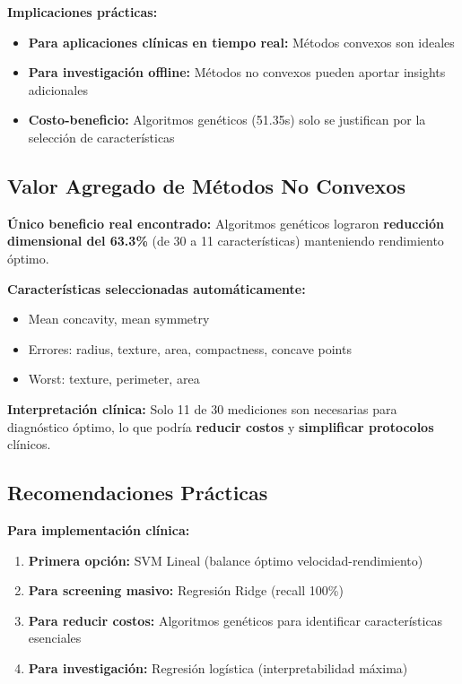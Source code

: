 \documentclass[12pt,a4paper]{article}
\begin{document}
\textbf{Implicaciones prácticas:}
\begin{itemize}
    \item \textbf{Para aplicaciones clínicas en tiempo real:} Métodos convexos son ideales
    \item \textbf{Para investigación offline:} Métodos no convexos pueden aportar insights adicionales
    \item \textbf{Costo-beneficio:} Algoritmos genéticos (51.35s) solo se justifican por la selección de características
\end{itemize}

\subsection{Valor Agregado de Métodos No Convexos}

\textbf{Único beneficio real encontrado:} Algoritmos genéticos lograron \textbf{reducción dimensional del 63.3\%} (de 30 a 11 características) manteniendo rendimiento óptimo.

\textbf{Características seleccionadas automáticamente:}
\begin{itemize}
    \item Mean concavity, mean symmetry
    \item Errores: radius, texture, area, compactness, concave points
    \item Worst: texture, perimeter, area
\end{itemize}

\textbf{Interpretación clínica:} Solo 11 de 30 mediciones son necesarias para diagnóstico óptimo, lo que podría \textbf{reducir costos} y \textbf{simplificar protocolos} clínicos.

\subsection{Recomendaciones Prácticas}

\textbf{Para implementación clínica:}
\begin{enumerate}
    \item \textbf{Primera opción:} SVM Lineal (balance óptimo velocidad-rendimiento)
    \item \textbf{Para screening masivo:} Regresión Ridge (recall 100\%)
    \item \textbf{Para reducir costos:} Algoritmos genéticos para identificar características esenciales
    \item \textbf{Para investigación:} Regresión logística (interpretabilidad máxima)
\end{enumerate}
\end{document}
